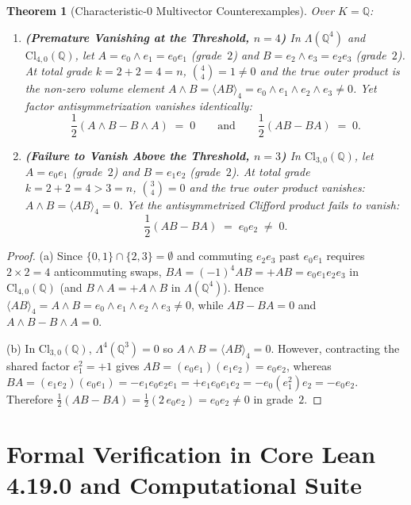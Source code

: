 \documentclass[11pt,a4paper]{article}
\newtheorem{theorem}{Theorem}[section]
\theoremstyle{definition}
\theoremstyle{remark}
\newcommand{\Cl}{\mathrm{Cl}}
\newcommand{\Q}{\mathbb{Q}}
\begin{document}
\begin{theorem}[Characteristic-$0$ Multivector Counterexamples]\label{thm:char0-multivectors}
Over $K = \Q$:
\begin{enumerate}
\item[(a)] \textbf{(Premature Vanishing at the Threshold, $n = 4$)} In $\Lambda(\Q^4)$ and $\Cl_{4,0}(\Q)$, let $A = e_0 \wedge e_1 = e_0 e_1$ (grade~$2$) and $B = e_2 \wedge e_3 = e_2 e_3$ (grade~$2$). At total grade $k = 2 + 2 = 4 = n$, $\binom{4}{4} = 1 \neq 0$ and the true outer product is the non-zero volume element $A \wedge B = \langle A B \rangle_4 = e_0 \wedge e_1 \wedge e_2 \wedge e_3 \neq 0$. Yet factor antisymmetrization vanishes identically:
\[
  \frac{1}{2}(A \wedge B - B \wedge A) \;=\; 0 \qquad \text{and} \qquad \frac{1}{2}(A B - B A) \;=\; 0.
\]
\item[(b)] \textbf{(Failure to Vanish Above the Threshold, $n = 3$)} In $\Cl_{3,0}(\Q)$, let $A = e_0 e_1$ (grade~$2$) and $B = e_1 e_2$ (grade~$2$). At total grade $k = 2 + 2 = 4 > 3 = n$, $\binom{3}{4} = 0$ and the true outer product vanishes: $A \wedge B = \langle A B \rangle_4 = 0$. Yet the antisymmetrized Clifford product fails to vanish:
\[
  \frac{1}{2}(A B - B A) \;=\; e_0 e_2 \;\neq\; 0.
\]
\end{enumerate}
\end{theorem}

\begin{proof}
(a) Since $\{0,1\} \cap \{2,3\} = \emptyset$ and commuting $e_2 e_3$ past $e_0 e_1$ requires $2 \times 2 = 4$ anticommuting swaps, $B A = (-1)^4 A B = +A B = e_0 e_1 e_2 e_3$ in $\Cl_{4,0}(\Q)$ (and $B \wedge A = +A \wedge B$ in $\Lambda(\Q^4)$). Hence $\langle A B \rangle_4 = A \wedge B = e_0 \wedge e_1 \wedge e_2 \wedge e_3 \neq 0$, while $A B - B A = 0$ and $A \wedge B - B \wedge A = 0$.

(b) In $\Cl_{3,0}(\Q)$, $\Lambda^4(\Q^3) = 0$ so $A \wedge B = \langle A B \rangle_4 = 0$. However, contracting the shared factor $e_1^2 = +1$ gives $A B = (e_0 e_1)(e_1 e_2) = e_0 e_2$, whereas $B A = (e_1 e_2)(e_0 e_1) = -e_1 e_0 e_2 e_1 = +e_1 e_0 e_1 e_2 = -e_0 (e_1^2) e_2 = -e_0 e_2$. Therefore $\frac{1}{2}(A B - B A) = \frac{1}{2}(2\,e_0 e_2) = e_0 e_2 \neq 0$ in grade~$2$.
\end{proof}

\section{Formal Verification in Core Lean 4.19.0 and Computational Suite}
\end{document}
